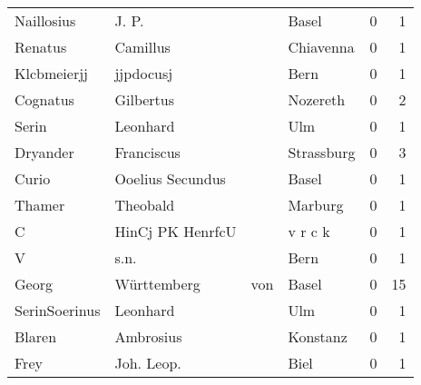 \begin{tabular}{llllrr}
               Naillosius &                              J. P. &             &                                       Basel &          0 &         1 \\
                  Renatus &                           Camillus &             &                                   Chiavenna &          0 &         1 \\
              Klcbmeierjj &                          jjpdocusj &             &                                        Bern &          0 &         1 \\
                 Cognatus &                          Gilbertus &             &                                    Nozereth &          0 &         2 \\
                    Serin &                           Leonhard &             &                                         Ulm &          0 &         1 \\
                 Dryander &                         Franciscus &             &                                  Strassburg &          0 &         3 \\
                    Curio &                   Ooelius Secundus &             &                                       Basel &          0 &         1 \\
                   Thamer &                           Theobald &             &                                     Marburg &          0 &         1 \\
                        C &                   HinCj PK HenrfcU &             &                                     v r c k &          0 &         1 \\
                        V &                               s.n. &             &                                        Bern &          0 &         1 \\
                    Georg &                        Württemberg &         von &                                       Basel &          0 &        15 \\
            SerinSoerinus &                           Leonhard &             &                                         Ulm &          0 &         1 \\
                   Blaren &                          Ambrosius &             &                                    Konstanz &          0 &         1 \\
                     Frey &                         Joh. Leop. &             &                                        Biel &          0 &         1 \\

\end{tabular}
